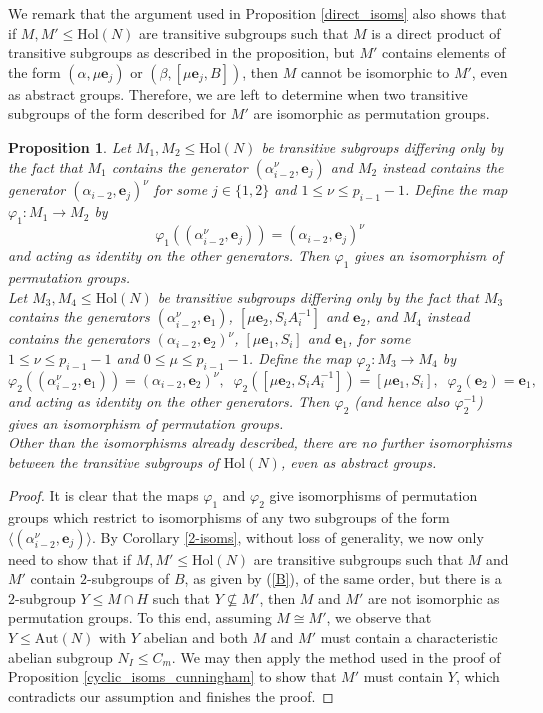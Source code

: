 \documentclass[a4paper,reqno]{amsart}
\newtheorem{proposition}[theorem]{Proposition}
\theoremstyle{definition}
\newcommand{\e}{\textbf{e}}
\newcommand{\Aut}{\mathrm{Aut}}
\newcommand{\Hol}{\mathrm{Hol}}
\begin{document}
We remark that the argument used in Proposition \ref{direct_isoms} also shows that if $M,M' \leq \Hol(N)$ are transitive subgroups such that $M$ is a direct product of transitive subgroups as described in the proposition, but $M'$ contains elements of the form $(\alpha,\mu\e_j)$ or $(\beta,[\mu\e_j,B])$, then $M$ cannot be isomorphic to $M'$, even as abstract groups. Therefore, we are left to determine when two transitive subgroups of the form described for $M'$ are isomorphic as permutation groups.
\begin{proposition}\label{indirect_isoms}
    Let $M_1,M_2 \leq \Hol(N)$ be transitive subgroups differing only by the fact that $M_1$ contains the generator $(\alpha_{i-2}^{\nu},\e_j)$ and $M_2$ instead contains the generator $(\alpha_{i-2},\e_j)^{\nu}$ for some $j \in \{1,2\}$ and $1 \leq \nu \leq p_{i-1}-1$. Define the map $\varphi_1:M_1 \to M_2$ by
    \[\varphi_1((\alpha_{i-2}^{\nu},\e_j))=(\alpha_{i-2},\e_j)^{\nu}\]
    and acting as identity on the other generators. Then $\varphi_1$ gives an isomorphism of permutation groups.\\

    Let $M_3,M_4 \leq \Hol(N)$ be transitive subgroups differing only by the fact that $M_3$ contains the generators $(\alpha_{i-2}^{\nu},\e_1)$, $[\mu\e_2,S_iA_i^{-1}]$ and $\e_2$, and $M_4$ instead contains the generators $(\alpha_{i-2},\e_2)^{\nu}$, $[\mu\e_1,S_i]$ and $\e_1$, for some $1 \leq \nu \leq p_{i-1}-1$ and $0 \leq \mu \leq p_{i-1}-1$. Define the map $\varphi_2:M_3 \to M_4$ by
    \[\varphi_2((\alpha_{i-2}^{\nu},\e_1))=(\alpha_{i-2},\e_2)^{\nu}, \;\; \varphi_2([\mu\e_2,S_iA_i^{-1}])=[\mu\e_1,S_i], \;\; \varphi_2(\e_2)=\e_1,\]
     and acting as identity on the other generators. Then $\varphi_2$ (and hence also $\varphi_2^{-1}$) gives an isomorphism of permutation groups.\\
    
    Other than the isomorphisms already described, there are no further isomorphisms between the transitive subgroups of $\Hol(N)$, even as abstract groups.
\end{proposition}
\begin{proof}
    It is clear that the maps $\varphi_1$ and $\varphi_2$ give isomorphisms of permutation groups which restrict to isomorphisms of any two subgroups of the form $\langle (\alpha_{i-2}^{\nu},\e_j) \rangle$. By Corollary \ref{2-isoms}, without loss of generality, we now only need to show that if $M,M' \leq \Hol(N)$ are transitive subgroups such that $M$ and $M'$ contain $2$-subgroups of $B$, as given by (\ref{B}), of the same order, but there is a $2$-subgroup $Y \leq M \cap H$ such that $Y \not\subseteq M'$, then $M$ and $M'$ are not isomorphic as permutation groups. To this end, assuming $M \cong M'$, we observe that $Y \leq \Aut(N)$ with $Y$ abelian and both $M$ and $M'$ must contain a characteristic abelian subgroup $N_I \leq C_m$. We may then apply the method used in the proof of Proposition \ref{cyclic_isoms_cunningham} to show that $M'$ must contain $Y$, which contradicts our assumption and finishes the proof.
\end{proof}
\end{document}
